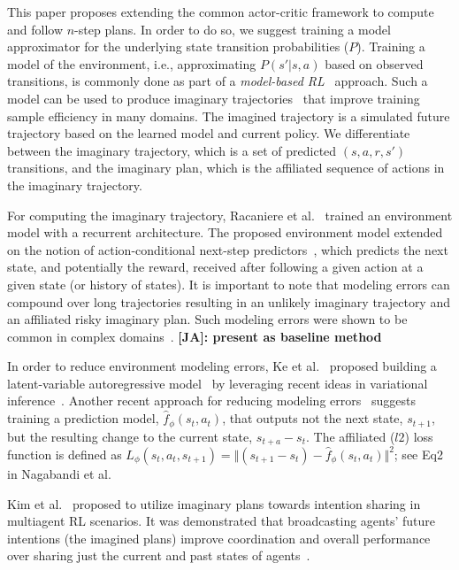 \documentclass[letterpaper]{article} %
\newcommand{\JA}[1] {{\color{red} \textbf{[JA]: #1}}}
\begin{document}
        This paper proposes extending the common actor-critic framework to compute and follow $n$-step plans. In order to do so, we suggest training a model approximator for the underlying state transition probabilities ($P$).   
        Training a model of the environment, i.e., approximating $P(s'|s,a)$ based on observed transitions, is commonly done as part of a \textit{model-based RL}~\cite{kaiser2019model,xu2020prediction} approach. Such a model can be used to produce imaginary trajectories~\cite{racaniere2017imagination} that improve training sample efficiency in many domains. The imagined trajectory is a simulated future trajectory based on the learned model and current policy. We differentiate between the imaginary trajectory, which is a set of predicted $(s,a,r,s')$ transitions, and the imaginary plan, which is the affiliated sequence of actions in the imaginary trajectory. 

        For computing the imaginary trajectory, Racaniere et al.~\citeyear{racaniere2017imagination} trained an environment model with a recurrent architecture. The proposed environment model extended on the notion of action-conditional next-step predictors~\cite{oh2015action,chiappa2017recurrent,leibfried2017deep}, which predicts the next state, and potentially the reward, received after following a given action at a given state (or history of states).
        It is important to note that modeling errors can compound over long trajectories resulting in an unlikely imaginary trajectory and an affiliated risky imaginary plan. Such modeling errors were shown to be common in complex domains~\cite{talvitie2014model,talvitie2015agnostic}. \JA{present as baseline method}

        In order to reduce environment modeling errors, Ke et al.~\citeyear{ke2018modeling} proposed building a latent-variable autoregressive model~\cite{gulrajani2016pixelvae} by leveraging recent ideas in variational inference~\cite{zhang2018advances}. Another recent approach for reducing modeling errors~\cite{nagabandi2018neural} suggests training a prediction model, $\hat{f}_\phi(s_t, a_t)$, that outputs not the next state, $s_{t+1}$, but the resulting change to the current state, $s_{t+a}-s_t$. The affiliated ($l2$) loss function is defined as $L_\phi(s_t,a_t,s_{t+1})=\Vert (s_{t+1}-s_t) -  \hat{f}_\phi(s_t, a_t) \Vert ^2$; see Eq2 in Nagabandi et al.

        Kim et al.~\citeyear{kim2020communication} proposed to utilize imaginary plans towards intention sharing in multiagent RL scenarios. It was demonstrated that broadcasting agents' future intentions (the imagined plans) improve coordination and overall performance over sharing just the current and past states of agents~\cite{foerster2016learning,sukhbaatar2016learning,jiang2018learning,das2019tarmac}.  
\end{document}
